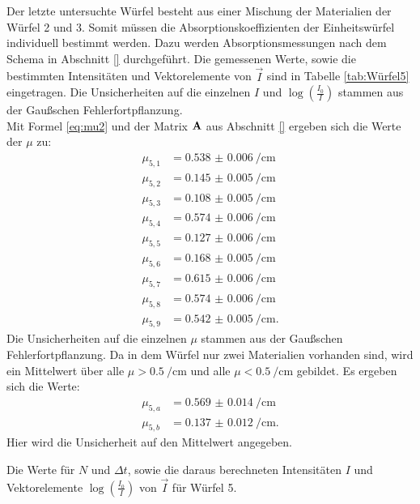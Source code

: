 Der letzte untersuchte Würfel besteht aus einer Mischung der Materialien der Würfel 2 und 3. Somit müssen die Absorptionskoeffizienten der Einheitswürfel individuell bestimmt werden. Dazu werden Absorptionsmessungen nach dem Schema in Abschnitt \ref{} durchgeführt. Die gemessenen Werte, sowie die bestimmten Intensitäten und Vektorelemente von $\vec{I}$ sind in Tabelle \ref{tab:Würfel5} eingetragen. Die Unsicherheiten auf die einzelnen $I$ und $\log\left(\frac{I_0}{I}\right)$ stammen aus der Gaußschen Fehlerfortpflanzung.\\
Mit Formel \eqref{eq:mu2} und der Matrix $\bold{A}$ aus Abschnitt \ref{} ergeben sich die Werte der $\mu$ zu:
\begin{align*}
\mu_{5,1} &= \SI{0.538(6)}{\per\centi\metre}\\
\mu_{5,2} &= \SI{0.145(5)}{\per\centi\metre}\\
\mu_{5,3} &= \SI{0.108(5)}{\per\centi\metre}\\
\mu_{5,4} &= \SI{0.574(6)}{\per\centi\metre}\\
\mu_{5,5} &= \SI{0.127(6)}{\per\centi\metre}\\
\mu_{5,6} &= \SI{0.168(5)}{\per\centi\metre}\\
\mu_{5,7} &= \SI{0.615(6)}{\per\centi\metre}\\
\mu_{5,8} &= \SI{0.574(6)}{\per\centi\metre}\\
\mu_{5,9} &= \SI{0.542(5)}{\per\centi\metre}\text{.}
\end{align*}
Die Unsicherheiten auf die einzelnen $\mu$ stammen aus der Gaußschen Fehlerfortpflanzung.
Da in dem Würfel nur zwei Materialien vorhanden sind, wird ein Mittelwert über alle $\mu >\SI{0.5}{\per\centi\metre}$ und alle $\mu <\SI{0.5}{\per\centi\metre}$ gebildet. Es ergeben sich die Werte:
\begin{align*}
\mu_{5,a} &= \SI{0.569(14)}{\per\centi\metre}\\
\mu_{5,b} &= \SI{0.137(12)}{\per\centi\metre}\text{.}
\end{align*}
Hier wird die Unsicherheit auf den Mittelwert angegeben.

\begin{table}
	\centering
	\caption{Die Werte für $N$ und $\Delta t$, sowie die daraus berechneten Intensitäten $I$ und Vektorelemente $\log\left(\frac{I_0}{I}\right)$ von $\vec{I}$ für Würfel 5.}
	
	\label{tab:Würfel5}
\end{table}

